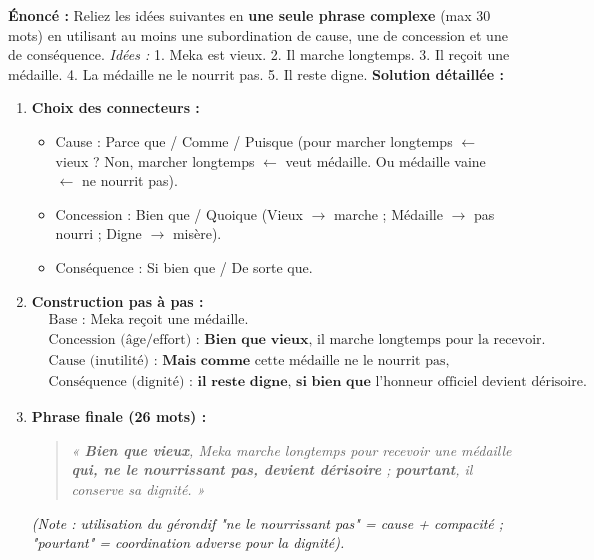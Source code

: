 \documentclass[11pt]{article}
\newcommand{\cle}[1]{{\popxbold\color{popdark}#1}}
\begin{document}
\begin{exoresolu}
    \textbf{Énoncé :} Reliez les idées suivantes en \textbf{une seule phrase complexe} (max 30 mots) en utilisant au moins une subordination de cause, une de concession et une de conséquence.
    \textit{Idées :} 1. Meka est vieux. 2. Il marche longtemps. 3. Il reçoit une médaille. 4. La médaille ne le nourrit pas. 5. Il reste digne.
    \tcblower
    \textbf{Solution détaillée :}
    \begin{enumerate}
        \item \textbf{Choix des connecteurs :}
            \begin{itemize}
                \item Cause : \cle{Parce que} / \cle{Comme} / \cle{Puisque} (pour marcher longtemps $\leftarrow$ vieux ? Non, marcher longtemps $\leftarrow$ veut médaille. Ou médaille vaine $\leftarrow$ ne nourrit pas).
                \item Concession : \cle{Bien que} / \cle{Quoique} (Vieux $\rightarrow$ marche ; Médaille $\rightarrow$ pas nourri ; Digne $\rightarrow$ misère).
                \item Conséquence : \cle{Si bien que} / \cle{De sorte que}.
            \end{itemize}
        \item \textbf{Construction pas à pas :}
            \begin{align*}
                &\text{Base : Meka reçoit une médaille.} \\
                &\text{Concession (âge/effort) : } \textbf{Bien que vieux,} \text{ il marche longtemps pour la recevoir.} \\
                &\text{Cause (inutilité) : } \textbf{Mais comme} \text{ cette médaille ne le nourrit pas,} \\
                &\text{Conséquence (dignité) : } \textbf{il reste digne, si bien que} \text{ l'honneur officiel devient dérisoire.}
            \end{align*}
        \item \textbf{Phrase finale (26 mots) :}
            \begin{quote}
                \textit{« \textbf{Bien que vieux}, Meka marche longtemps pour recevoir une médaille \textbf{qui, ne le nourrissant pas, devient dérisoire} ; \textbf{pourtant}, il conserve sa dignité. »}
            \end{quote}
            \textit{(Note : utilisation du gérondif "ne le nourrissant pas" = cause + compacité ; "pourtant" = coordination adverse pour la dignité).}

\end{enumerate}
\end{exoresolu}
\end{document}
